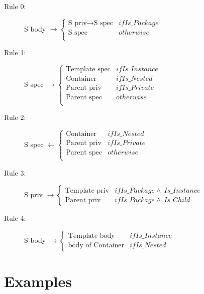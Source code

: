 \documentclass{article}
\begin{document}
\begin{description}
\item[Rule 0:] S body $\rightarrow
  \begin{cases*}
    \text{S priv} \rightarrow \text{S spec} & if Is\_Package \\
    \text{S spec}                           & otherwise      \\
  \end{cases*}$

\item[Rule 1:] S spec $\rightarrow
  \begin{cases*}
    \text{Template spec} & if Is\_Instance \\
    \text{Container}     & if Is\_Nested   \\
    \text{Parent priv}   & if Is\_Private  \\
    \text{Parent spec}   & otherwise       \\
  \end{cases*}$

\item[Rule 2:] S spec $\leftarrow
  \begin{cases*}
    \text{Container}   & if Is\_Nested  \\
    \text{Parent priv} & if Is\_Private \\
    \text{Parent spec} & otherwise      \\
  \end{cases*}$

\item[Rule 3:] S priv $\rightarrow
  \begin{cases*}
    \text{Template priv} & if Is\_Package \land\ Is\_Instance \\
    \text{Parent priv}   & if Is\_Package \land\ Is\_Child
  \end{cases*}$

\item[Rule 4:] S body $\rightarrow
  \begin{cases*}
    \text{Template body}     & if Is\_Instance \\
    \text{body of Container} & if Is\_Nested
  \end{cases*}$
\end{description}

\pagebreak
\section{Examples}





\end{document}
